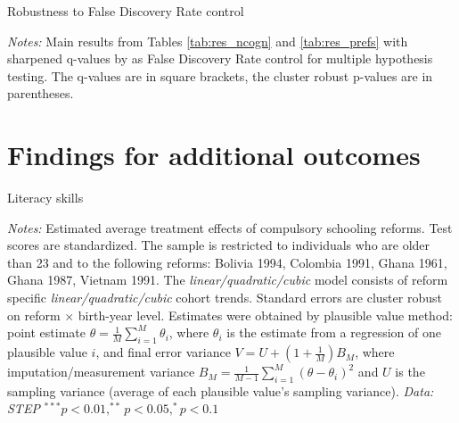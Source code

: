 \begin{table}[htbp]
	\caption{Robustness to False Discovery Rate control}
	\label{tab:qvalues}
	\centering
	\begin{threeparttable}
		
		\begin{tablenotes}
			\footnotesize
			\item \textit{Notes:} Main results from Tables \ref{tab:res_ncogn} and \ref{tab:res_prefs} with sharpened q-values by \citet{anderson_multiple_2008} as False Discovery Rate control for multiple hypothesis testing. The q-values are in square brackets, the cluster robust p-values are in parentheses.
		\end{tablenotes}
	\end{threeparttable}
\end{table}



\newpage
\section{Findings for additional outcomes} \label{sec:app_add_outcomes}
\setcounter{table}{0}
\setcounter{figure}{0}
\renewcommand{\thetable}{\Alph{section}.\arabic{table}}
\renewcommand\thefigure{\Alph{section}.\arabic{figure}}

\begin{table}[htbp]
	\caption{Literacy skills}
	\label{tab:res_lit_test}
	\centering
	\begin{threeparttable}
		\footnotesize
		
		\begin{tablenotes}
			\footnotesize
			\item \textit{Notes:} Estimated average treatment effects of compulsory schooling reforms. Test scores are standardized. The sample is restricted to individuals who are older than 23 and to the following reforms: Bolivia 1994, Colombia 1991, Ghana 1961, Ghana 1987, Vietnam 1991. The \textit{linear/quadratic/cubic} model consists of reform specific \textit{linear/quadratic/cubic} cohort trends. Standard errors are cluster robust on reform $\times$ birth-year level. Estimates were obtained by plausible value method: point estimate $\theta = \frac{1}{M} \sum_{i=1}^{M}\theta_i$, where $\theta_i$ is the estimate from a regression of one plausible value $i$, and final error variance $ V = U + (1+\frac{1}{M}) B_M $, where imputation/measurement variance $B_M = \frac{1}{M-1} \sum_{i=1}^{M} (\theta - \theta_i)^2 $ and $U$ is the sampling variance (average of each plausible value's sampling variance). \textit{Data: STEP} $^{***} p < 0.01, ^{**} p < 0.05, ^{*} p < 0.1$
		\end{tablenotes}
	\end{threeparttable}
\end{table}

